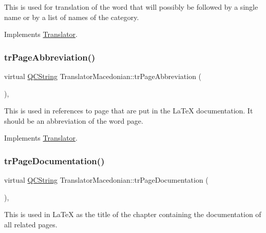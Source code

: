 This is used for translation of the word that will possibly be followed by a single name or by a list of names of the category. 

Implements \mbox{\hyperlink{class_translator}{Translator}}.

\mbox{\label{class_translator_macedonian_afbafcf31607b6d074b2f3d4cf13c8702}} 
\subsubsection{\texorpdfstring{trPageAbbreviation()}{trPageAbbreviation()}}
{\footnotesize\ttfamily virtual \mbox{\hyperlink{class_q_c_string}{Q\+C\+String}} Translator\+Macedonian\+::tr\+Page\+Abbreviation (\begin{DoxyParamCaption}{ }\end{DoxyParamCaption})\hspace{0.3cm}{\ttfamily [inline]}, {\ttfamily [virtual]}}

This is used in references to page that are put in the La\+TeX documentation. It should be an abbreviation of the word page. 

Implements \mbox{\hyperlink{class_translator}{Translator}}.

\mbox{\label{class_translator_macedonian_a2f7fea77e6aacb84acfb98a95cc01aec}} 
\subsubsection{\texorpdfstring{trPageDocumentation()}{trPageDocumentation()}}
{\footnotesize\ttfamily virtual \mbox{\hyperlink{class_q_c_string}{Q\+C\+String}} Translator\+Macedonian\+::tr\+Page\+Documentation (\begin{DoxyParamCaption}{ }\end{DoxyParamCaption})\hspace{0.3cm}{\ttfamily [inline]}, {\ttfamily [virtual]}}

This is used in La\+TeX as the title of the chapter containing the documentation of all related pages. 

